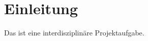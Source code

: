 \documentclass[a4,paper,fleqn]{article}
\begin{document}


\tableofcontents

\newpage

\section{Einleitung}
Das ist eine interdisziplinäre Projektaufgabe. 

\newpage

\listoffigures
\end{document}
